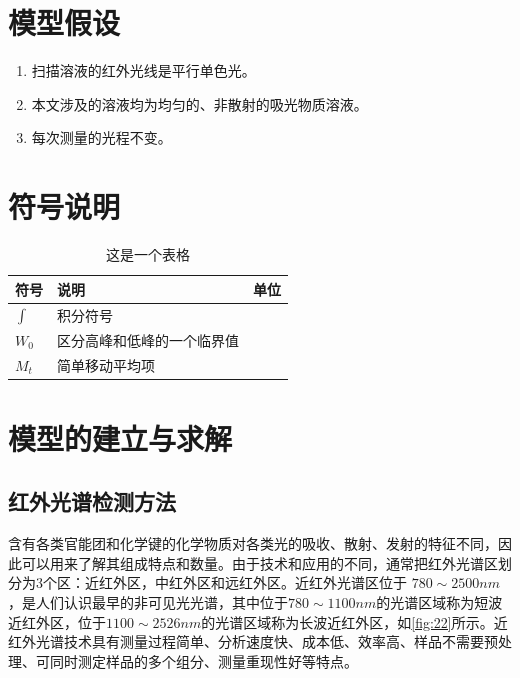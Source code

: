 \documentclass[UTF8]{ctexart}
\begin{document}
\section{模型假设}

\begin{enumerate}
	\item 扫描溶液的红外光线是平行单色光。
	\item 本文涉及的溶液均为均匀的、非散射的吸光物质溶液。
	\item 每次测量的光程不变。
\end{enumerate}

\section{符号说明}

\begin{table}[H]
\centering
\caption{这是一个表格}
    \begin{tabular}{p{4.5cm} p{4.5cm} p{4.5cm}}%
		\hline
		符号 & 说明 & 单位 \\ %
		\hline
		$\int$ & 积分符号 &  \\ %
		$W_0$ & 区分高峰和低峰的一个临界值 &  \\ %
		$M_t$ &  简单移动平均项 &  \\ %
		\hline
	\end{tabular}
\end{table}

\section{模型的建立与求解}
\subsection{红外光谱检测方法}

含有各类官能团和化学键的化学物质对各类光的吸收、散射、发射的特征不同，因此可以用来了解其组成特点和数量\cite{02}。由于技术和应用的不同，通常把红外光谱区划分为3个区：近红外区，中红外区和远红外区。近红外光谱区位于 $ 780 \sim  2500 nm $，是人们认识最早的非可见光光谱，其中位于$ 780 \sim 1100nm $的光谱区域称为短波近红外区，位于$ 1100 \sim 2526nm $的光谱区域称为长波近红外区，如\ref{fig:22}所示。近红外光谱技术具有测量过程简单、分析速度快、成本低、效率高、样品不需要预处理、可同时测定样品的多个组分、测量重现性好等特点。
\end{document}

